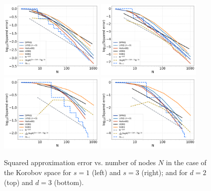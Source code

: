 \documentclass[twoside,11pt]{book}
\numberwithin{theorem}{chapter}
\numberwithin{definition}{chapter}
\numberwithin{proposition}{chapter}
\numberwithin{corollary}{chapter}
\numberwithin{example}{chapter}
\numberwithin{lemma}{chapter}
\numberwithin{assumption}{chapter}
\numberwithin{equation}{chapter}
\numberwithin{figure}{chapter}
\begin{document}
\begin{figure}
\centering
\includegraphics[width=0.45\textwidth]{img/neurips/multiSobolev/Sobolev_2D_ko_1_fig_L_2.pdf}
\includegraphics[width=0.45\textwidth]{img/neurips/multiSobolev/Sobolev_2D_ko_2_fig_L_2.pdf}\\
\includegraphics[width=0.45\textwidth]{img/neurips/multiSobolev/Sobolev_3D_ko_1_fig_L_2.pdf}
\includegraphics[width=0.45\textwidth]{img/neurips/multiSobolev/Sobolev_3D_ko_2_fig_L_2.pdf}
\caption{Squared approximation error vs. number of nodes $N$ in the case of the Korobov space for $s = 1$ (left) and $s=3$ (right); and for $d =2$ (top) and $d=3$ (bottom).
\label{fig:Korobov_DPPKQ_multialgo_results}}
\end{figure} 
\end{document}
